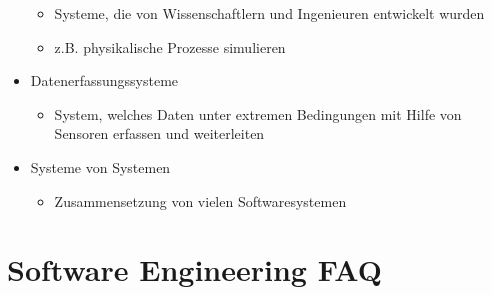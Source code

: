 \begin{itemize}
\begin{itemize}
        \item Systeme, die von Wissenschaftlern und Ingenieuren entwickelt wurden
        \item z.B. physikalische Prozesse simulieren
    \end{itemize}
    \item Datenerfassungssysteme
    \begin{itemize}
        \item System, welches Daten unter extremen Bedingungen mit Hilfe von Sensoren erfassen und weiterleiten
    \end{itemize}
    \item Systeme von Systemen
    \begin{itemize}
        \item Zusammensetzung von vielen Softwaresystemen
    \end{itemize}
\end{itemize}

\section{Software Engineering FAQ}

